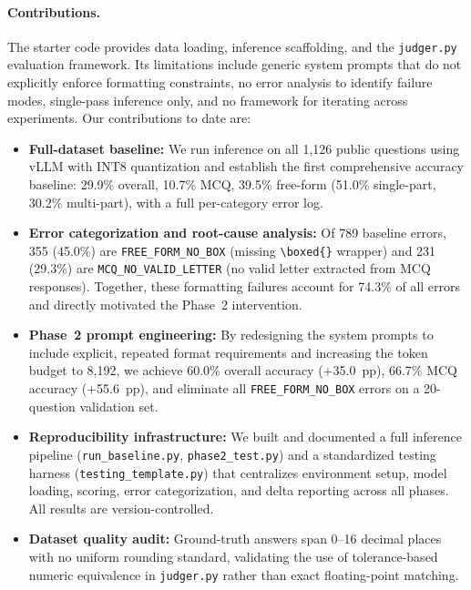 \documentclass{article}
\begin{document}
\paragraph{Contributions.}
The starter code provides data loading, inference scaffolding, and the \texttt{judger.py} evaluation framework. Its limitations include generic system prompts that do not explicitly enforce formatting constraints, no error analysis to identify failure modes, single-pass inference only, and no framework for iterating across experiments. Our contributions to date are:

\begin{itemize}
  \item \textbf{Full-dataset baseline:} We run inference on all 1,126 public questions using vLLM with INT8 quantization and establish the first comprehensive accuracy baseline: 29.9\% overall, 10.7\% MCQ, 39.5\% free-form (51.0\% single-part, 30.2\% multi-part), with a full per-category error log.

  \item \textbf{Error categorization and root-cause analysis:} Of 789 baseline errors, 355 (45.0\%) are \texttt{FREE\_FORM\_NO\_BOX} (missing \texttt{\textbackslash boxed\{\}} wrapper) and 231 (29.3\%) are \texttt{MCQ\_NO\_VALID\_LETTER} (no valid letter extracted from MCQ responses). Together, these formatting failures account for 74.3\% of all errors and directly motivated the Phase~2 intervention.

  \item \textbf{Phase~2 prompt engineering:} By redesigning the system prompts to include explicit, repeated format requirements and increasing the token budget to 8,192, we achieve 60.0\% overall accuracy (+35.0~pp), 66.7\% MCQ accuracy (+55.6~pp), and eliminate all \texttt{FREE\_FORM\_NO\_BOX} errors on a 20-question validation set.

  \item \textbf{Reproducibility infrastructure:} We built and documented a full inference pipeline (\texttt{run\_baseline.py}, \texttt{phase2\_test.py}) and a standardized testing harness (\texttt{testing\_template.py}) that centralizes environment setup, model loading, scoring, error categorization, and delta reporting across all phases. All results are version-controlled.

  \item \textbf{Dataset quality audit:} Ground-truth answers span 0--16 decimal places with no uniform rounding standard, validating the use of tolerance-based numeric equivalence in \texttt{judger.py} rather than exact floating-point matching.
\end{itemize}
\end{document}
